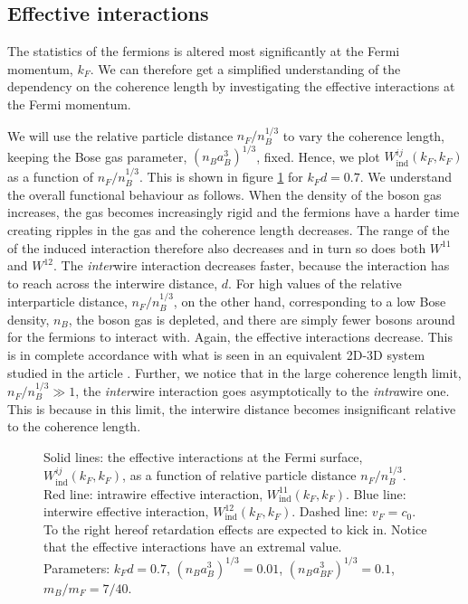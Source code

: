 \subsection{Effective interactions} \label{subsec.effectiveinteractions}
The statistics of the fermions is altered most significantly at the Fermi momentum, $k_F$. We can therefore get a simplified understanding of the dependency on the coherence length by investigating the effective interactions at the Fermi momentum. 

We will use the relative particle distance $n_F / n_B^{1/3}$ to vary the coherence length, keeping the Bose gas parameter, $(n_Ba_B^3)^{1/3}$, fixed. Hence, we plot $W^{ij}_{\text{ind}}(k_F,k_F)$ as a function of $n_F / n_B^{1/3}$. This is shown in figure \ref{fig.EffectiveInteraction.nBdepend} for $k_Fd = 0.7$. We understand the overall functional behaviour as follows. When the density of the boson gas increases, the gas becomes increasingly rigid and the fermions have a harder time creating ripples in the gas and the coherence length decreases. The range of the of the induced interaction therefore also decreases and in turn so does both $W^{11}$ and $W^{12}$. The \textit{inter}wire interaction decreases faster, because the interaction has to reach across the interwire distance, $d$. For high values of the relative interparticle distance, $n_F / n_B^{1/3}$, on the other hand, corresponding to a low Bose density, $n_B$, the boson gas is depleted, and there are simply fewer bosons around for the fermions to interact with. Again, the effective interactions decrease. This is in complete accordance with what is seen in an equivalent 2D-3D system studied in the article \cite{BruunZhigangTopSuperfluid}. Further, we notice that in the large coherence length limit, $n_F / n_B^{1/3} \gg 1$, the \textit{inter}wire interaction goes asymptotically to the \textit{intra}wire one. This is because in this limit, the interwire distance becomes insignificant relative to the coherence length. 

\begin{figure} 
\begin{center}  
  
\caption{Solid lines: the effective interactions at the Fermi surface, $W^{ij}_{\text{ind}}(k_F,k_F)$, as a function of relative particle distance $n_F/n_B^{1/3}$. Red line: intrawire effective interaction, $W^{11}_{\text{ind}}(k_F,k_F)$. Blue line: interwire effective interaction, $W^{12}_{\text{ind}}(k_F,k_F)$. Dashed line: $v_F = c_0$. To the right hereof retardation effects are expected to kick in. Notice that the effective interactions have an extremal value. \\
Parameters: $k_Fd = 0.7$, $(n_Ba_B^3)^{1/3} = 0.01$, $(n_Ba_{BF}^3)^{1/3} = 0.1$, $m_B / m_F = 7/40$.}  
\label{fig.EffectiveInteraction.nBdepend}  
\end{center}    
\end{figure}

